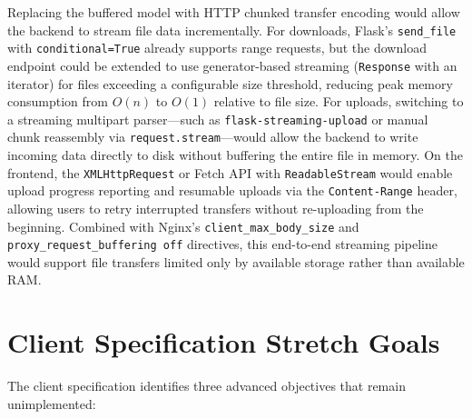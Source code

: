 \documentclass[12pt,letterpaper]{report}
\begin{document}
Replacing the buffered model with HTTP chunked transfer encoding would allow the backend to stream file data incrementally. For downloads, Flask's \texttt{send\_file} with \texttt{conditional=True} already supports range requests, but the download endpoint could be extended to use generator-based streaming (\texttt{Response} with an iterator) for files exceeding a configurable size threshold, reducing peak memory consumption from $O(n)$ to $O(1)$ relative to file size. For uploads, switching to a streaming multipart parser---such as \texttt{flask-streaming-upload} or manual chunk reassembly via \texttt{request.stream}---would allow the backend to write incoming data directly to disk without buffering the entire file in memory. On the frontend, the \texttt{XMLHttpRequest} or Fetch API with \texttt{ReadableStream} would enable upload progress reporting and resumable uploads via the \texttt{Content-Range} header, allowing users to retry interrupted transfers without re-uploading from the beginning. Combined with Nginx's \texttt{client\_max\_body\_size} and \texttt{proxy\_request\_buffering off} directives, this end-to-end streaming pipeline would support file transfers limited only by available storage rather than available RAM.

\section{Client Specification Stretch Goals}

The client specification identifies three advanced objectives that remain unimplemented:
\end{document}
